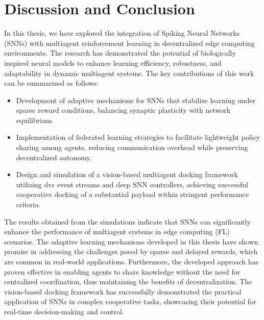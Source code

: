 \chapter{Discussion and Conclusion}
\label{chap:discussion_and_conclusion}

In this thesis, we have explored the integration of Spiking Neural Networks (SNNs) with multiagent reinforcement learning in decentralized edge computing environments. The research has demonstrated the potential of biologically inspired neural models to enhance learning efficiency, robustness, and adaptability in dynamic multiagent systems. The key contributions of this work can be summarized as follows:
\begin{itemize}
    \item Development of adaptive mechanisms for SNNs that stabilize learning under sparse reward conditions, balancing synaptic plasticity with network equilibrium.
    \item Implementation of federated learning strategies to facilitate lightweight policy sharing among agents, reducing communication overhead while preserving decentralized autonomy.
    \item Design and simulation of a vision-based multiagent docking framework utilizing \ac{dvs} event streams and deep SNN controllers, achieving successful cooperative docking of a substantial payload within stringent performance criteria.
  \end{itemize}
The results obtained from the simulations indicate that SNNs can significantly enhance the performance of multiagent systems in edge computing (FL) scenarios. The adaptive learning mechanisms developed in this thesis have shown promise in addressing the challenges posed by sparse and delayed rewards, which are common in real-world applications.
Furthermore, the developed approach has proven effective in enabling agents to share knowledge without the need for centralized coordination, thus maintaining the benefits of decentralization. The vision-based docking framework has successfully demonstrated the practical application of SNNs in complex cooperative tasks, showcasing their potential for real-time decision-making and control.


